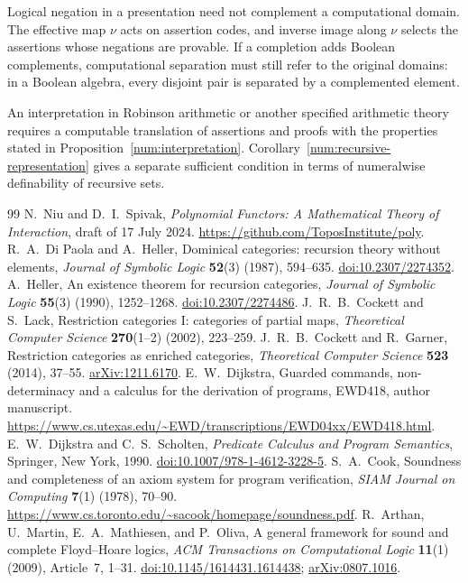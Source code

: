 \documentclass[11pt]{article}
\theoremstyle{definition}
\theoremstyle{remark}
\begin{document}
Logical negation in a presentation need not complement a computational
domain. The effective map $\nu$ acts on assertion codes, and inverse
image along $\nu$ selects the assertions whose negations are provable.
If a completion adds Boolean complements, computational separation must
still refer to the original domains: in a Boolean algebra, every
disjoint pair is separated by a complemented element.

An interpretation in Robinson arithmetic or another specified arithmetic
theory requires a computable translation of assertions and proofs with
the properties stated in Proposition~\ref{num:interpretation}.
Corollary~\ref{num:recursive-representation} gives a separate sufficient
condition in terms of numeralwise definability of recursive sets.

\begin{thebibliography}{99}
 N.~Niu and D.~I.~Spivak,
\emph{Polynomial Functors: A Mathematical Theory of Interaction},
draft of 17 July 2024.
\url{https://github.com/ToposInstitute/poly}.
 R.~A.~Di Paola and A.~Heller,
Dominical categories: recursion theory without elements,
\emph{Journal of Symbolic Logic} \textbf{52}(3) (1987), 594--635.
\href{https://doi.org/10.2307/2274352}{doi:10.2307/2274352}.
 A.~Heller,
An existence theorem for recursion categories,
\emph{Journal of Symbolic Logic} \textbf{55}(3) (1990), 1252--1268.
\href{https://doi.org/10.2307/2274486}{doi:10.2307/2274486}.
 J.~R.~B.~Cockett and S.~Lack,
Restriction categories I: categories of partial maps,
\emph{Theoretical Computer Science} \textbf{270}(1--2) (2002), 223--259.
 J.~R.~B.~Cockett and R.~Garner,
Restriction categories as enriched categories,
\emph{Theoretical Computer Science} \textbf{523} (2014), 37--55.
\href{https://arxiv.org/abs/1211.6170}{arXiv:1211.6170}.
 E.~W.~Dijkstra,
Guarded commands, non-determinacy and a calculus for the derivation of programs,
EWD418, author manuscript.
\url{https://www.cs.utexas.edu/~EWD/transcriptions/EWD04xx/EWD418.html}.
 E.~W.~Dijkstra and C.~S.~Scholten,
\emph{Predicate Calculus and Program Semantics},
Springer, New York, 1990.
\href{https://doi.org/10.1007/978-1-4612-3228-5}{doi:10.1007/978-1-4612-3228-5}.
 S.~A.~Cook,
Soundness and completeness of an axiom system for program verification,
\emph{SIAM Journal on Computing} \textbf{7}(1) (1978), 70--90.
\url{https://www.cs.toronto.edu/~sacook/homepage/soundness.pdf}.
 R.~Arthan, U.~Martin, E.~A.~Mathiesen, and P.~Oliva,
A general framework for sound and complete Floyd--Hoare logics,
\emph{ACM Transactions on Computational Logic} \textbf{11}(1) (2009),
Article~7, 1--31.
\href{https://doi.org/10.1145/1614431.1614438}{doi:10.1145/1614431.1614438};
\href{https://arxiv.org/abs/0807.1016}{arXiv:0807.1016}.
\end{thebibliography}
\end{document}
